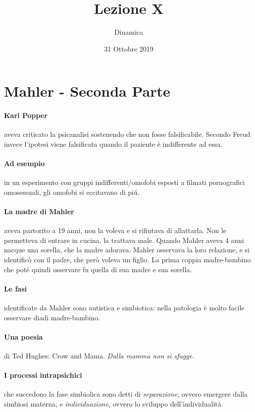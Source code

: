 \documentclass[12pt, a4paper]{article}
\title{Lezione X}
\date{31 Ottobre 2019}
\author{Dinamica}
\begin{document}
\maketitle

\section{Mahler - Seconda Parte}
\paragraph{Karl Popper} aveva criticato la psicanalisi sostenendo che non fosse falsificabile. Secondo Freud invece l'ipotesi viene falsificata quando il paziente è indifferente ad essa.

\paragraph{Ad esempio} in un esperimento con gruppi indifferenti/omofobi esposti a filmati pornografici omosessuali, gli omofobi si eccitavano di pi\'u.

\paragraph{La madre di Mahler} aveva partorito a 19 anni, non la voleva e si rifiutava di allattarla. Non le permetteva di entrare in cucina, la trattava male. Quando Mahler aveva 4 anni nacque una sorella, che la madre adorava. Mahler osservava la loro relazione, e si identificò con il padre, che però voleva un figlio. La prima coppia madre-bambino che pot\'e quindi osservare fu quella di sua madre e sua sorella.

\paragraph{Le fasi} identificate da Mahler sono autistica e simbiotica: nella patologia \`e molto facile osservare diadi madre-bambino.

\paragraph{Una poesia} di Ted Hughes: Crow and Mama. \emph{Dalla mamma non si sfugge.}

\paragraph{I processi intrapsichici} che succedono la fase simbiolica sono detti di \emph{separazione}, ovvero emergere dalla simbiosi materna, e \emph{individuazione}, ovvero lo sviluppo dell'individualit\`a.
\end{document}

